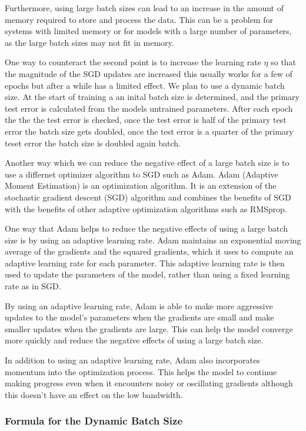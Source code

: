 \documentclass[11pt]{article}
\begin{document}
Furthermore, using large batch sizes can lead to an increase in the amount of memory required to store and process the data. This can be a problem for systems with limited memory or for models with a large number of parameters, as the large batch sizes may not fit in memory.

One way to counteract the second point is to increase the learning rate $\eta$ so that the magnitude of the SGD updates are increased this usually works for a few of epochs but after a while has a limited effect. We plan to use a dynamic batch size. At the start of training a an inital batch size is determined, and the primary test error is calculated from the models untrained parameters. After each epoch the the the test error is checked, once the test error is half of the primary test error the batch size gets doubled, once the test error is a quarter of the primary teset error the batch size is doubled again batch.

Another way which we can reduce the negative effect of a large batch size is to use a differnet optimizer algorithm to SGD such as Adam. Adam (Adaptive Moment Estimation) is an optimization algorithm. It is an extension of the stochastic gradient descent (SGD) algorithm and combines the benefits of SGD with the benefits of other adaptive optimization algorithms such as RMSprop. 

One way that Adam helps to reduce the negative effects of using a large batch size is by using an adaptive learning rate. Adam maintains an exponential moving average of the gradients and the squared gradients, which it uses to compute an adaptive learning rate for each parameter. This adaptive learning rate is then used to update the parameters of the model, rather than using a fixed learning rate as in SGD. 

By using an adaptive learning rate, Adam is able to make more aggressive updates to the model's parameters when the gradients are small and make smaller updates when the gradients are large. This can help the model converge more quickly and reduce the negative effects of using a large batch size.
 
In addition to using an adaptive learning rate, Adam also incorporates momentum into the optimization process. This helps the model to continue making progress even when it encounters noisy or oscillating gradients although this doesn't have an effect on the low bandwidth.

\subsubsection{Formula for the Dynamic Batch Size}
\end{document}
